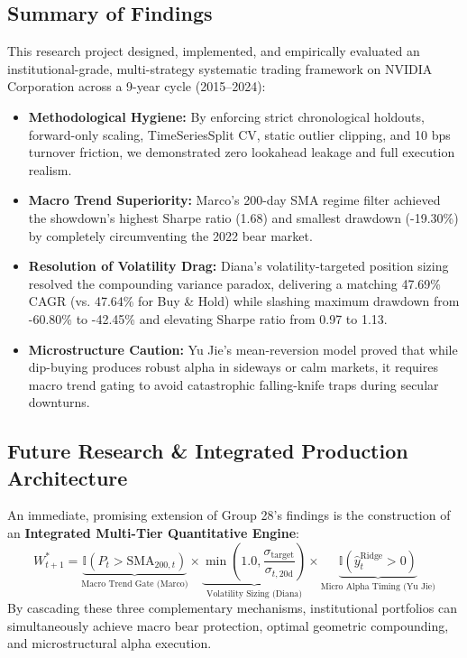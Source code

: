 \documentclass[12pt, a4paper]{article}
\begin{document}
\subsection{Summary of Findings}
This research project designed, implemented, and empirically evaluated an institutional-grade, multi-strategy systematic trading framework on NVIDIA Corporation across a 9-year cycle (2015--2024):
\begin{itemize}
    \item \textbf{Methodological Hygiene:} By enforcing strict chronological holdouts, forward-only scaling, TimeSeriesSplit CV, static outlier clipping, and 10 bps turnover friction, we demonstrated zero lookahead leakage and full execution realism.
    \item \textbf{Macro Trend Superiority:} Marco's 200-day SMA regime filter achieved the showdown's highest Sharpe ratio (1.68) and smallest drawdown (-19.30\%) by completely circumventing the 2022 bear market.
    \item \textbf{Resolution of Volatility Drag:} Diana's volatility-targeted position sizing resolved the compounding variance paradox, delivering a matching 47.69\% CAGR (vs. 47.64\% for Buy \& Hold) while slashing maximum drawdown from -60.80\% to -42.45\% and elevating Sharpe ratio from 0.97 to 1.13.
    \item \textbf{Microstructure Caution:} Yu Jie's mean-reversion model proved that while dip-buying produces robust alpha in sideways or calm markets, it requires macro trend gating to avoid catastrophic falling-knife traps during secular downturns.
\end{itemize}

\subsection{Future Research \& Integrated Production Architecture}
An immediate, promising extension of Group 28's findings is the construction of an \textbf{Integrated Multi-Tier Quantitative Engine}:
\begin{equation}
W_{t+1}^* = \underbrace{\mathbb{I}(P_t > \text{SMA}_{200, t})}_{\text{Macro Trend Gate (Marco)}} \times \underbrace{\min\left(1.0, \frac{\sigma_{\text{target}}}{\sigma_{t, 20\text{d}}}\right)}_{\text{Volatility Sizing (Diana)}} \times \underbrace{\mathbb{I}(\hat{y}_{t}^{\text{Ridge}} > 0)}_{\text{Micro Alpha Timing (Yu Jie)}}
\end{equation}
By cascading these three complementary mechanisms, institutional portfolios can simultaneously achieve macro bear protection, optimal geometric compounding, and microstructural alpha execution.
\end{document}
